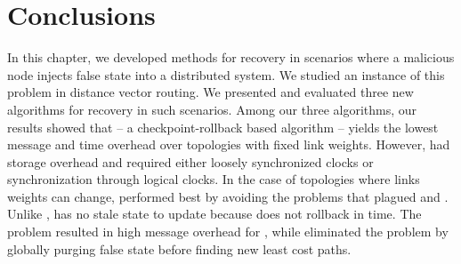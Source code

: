 \section{Conclusions}
\label{sec:rollback-conclude}

In this chapter, we developed methods for recovery in scenarios where a malicious node injects false state into a distributed system.  
We studied an instance of this problem in distance vector routing.
We presented and evaluated three new algorithms for recovery in such scenarios. %
Among our three algorithms, our results showed that \cpr -- a checkpoint-rollback based algorithm -- yields the lowest message and time overhead over topologies
with fixed link weights.  However, \cpr had storage overhead and required either loosely synchronized clocks or synchronization through logical clocks.
In the case of topologies where links weights can change, \purge performed best by avoiding the problems that plagued \cpr and \seconds.
Unlike \cprs, \purge has no stale state to update because \purge does not rollback in time.  
The \infinity problem resulted in high message overhead for \seconds, while \purge eliminated the \infinity problem by globally purging false state before finding new least cost paths.



